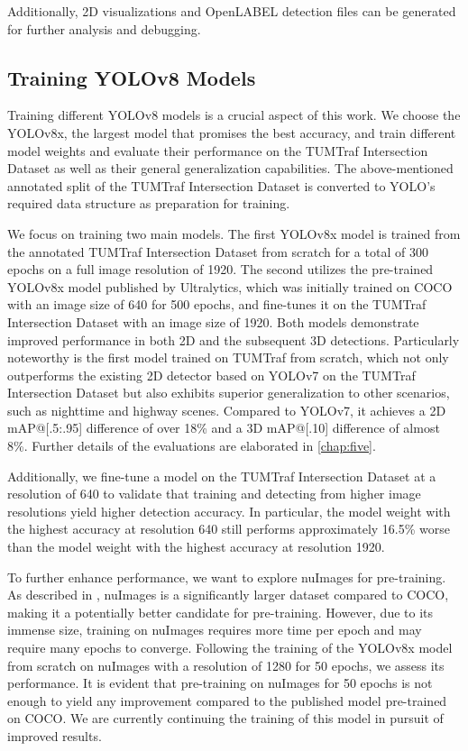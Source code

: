Additionally, 2D visualizations and OpenLABEL detection files can be generated for further analysis and debugging.

\subsection{Training YOLOv8 Models}

Training different YOLOv8 models is a crucial aspect of this work. We choose the YOLOv8x, the largest model that promises the best accuracy, and train different model weights and evaluate their performance on the TUMTraf Intersection Dataset as well as their general generalization capabilities. The above-mentioned annotated split of the TUMTraf Intersection Dataset is converted to YOLO's required data structure as preparation for training. 

We focus on training two main models. The first YOLOv8x model is trained from the annotated TUMTraf Intersection Dataset from scratch for a total of 300 epochs on a full image resolution of 1920. The second utilizes the pre-trained YOLOv8x model published by Ultralytics, which was initially trained on COCO with an image size of 640 for 500 epochs, and fine-tunes it on the TUMTraf Intersection Dataset with an image size of 1920. Both models demonstrate improved performance in both 2D and the subsequent 3D detections. Particularly noteworthy is the first model trained on TUMTraf from scratch, which not only outperforms the existing 2D detector based on YOLOv7 on the TUMTraf Intersection Dataset but also exhibits superior generalization to other scenarios, such as nighttime and highway scenes. Compared to YOLOv7, it achieves a 2D mAP@[.5:.95] difference of over 18\% and a 3D mAP@[.10] difference of almost 8\%. Further details of the evaluations are elaborated in \cref{chap:five}. 

Additionally, we fine-tune a model on the TUMTraf Intersection Dataset at a resolution of 640 to validate that training and detecting from higher image resolutions yield higher detection accuracy. In particular, the model weight with the highest accuracy at resolution 640 still performs approximately 16.5\% worse than the model weight with the highest accuracy at resolution 1920. 

To further enhance performance, we want to explore nuImages for pre-training. As described in , nuImages is a significantly larger dataset compared to COCO, making it a potentially better candidate for pre-training. However, due to its immense size, training on nuImages requires more time per epoch and may require many epochs to converge. Following the training of the YOLOv8x model from scratch on nuImages with a resolution of 1280 for 50 epochs, we assess its performance. It is evident that pre-training on nuImages for 50 epochs is not enough to yield any improvement compared to the published model pre-trained on COCO. We are currently continuing the training of this model in pursuit of improved results.

